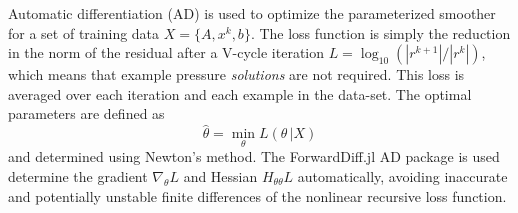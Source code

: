 \documentclass[review]{elsarticle}
\begin{document}
Automatic differentiation (AD) is used to optimize the parameterized smoother for a set of training data $X=\{A,x^k,b\}$. The loss function is simply the reduction in the norm of the residual after a V-cycle iteration $L = \log_{10}(|r^{k+1}| / |r^{k}|)$, which means that example pressure \textit{solutions} are not required. This loss is averaged over each iteration and each example in the data-set. The optimal parameters are defined as
\begin{equation}
    \hat\theta = \min_\theta L(\theta\, |X)
\end{equation}
and determined using Newton's method. The ForwardDiff.jl AD package is used determine the gradient $\nabla_\theta L$ and Hessian $H_{\theta\theta} L$ automatically, avoiding inaccurate and potentially unstable finite differences of the nonlinear recursive loss function.
\end{document}
